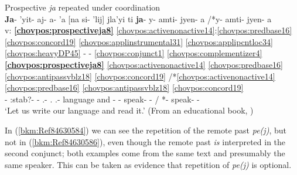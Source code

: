 \documentclass[output=paper]{langscibook}
\begin{document}
\ea\label{bkm:Ref84601460}Prospective \textit{ja} repeated under coordination \\ 
\glll {} \textbf{Ja}{}- 'yit- aj- a- 'a [na si- 'lij] jla'yi ti \textbf{ja}{}- y- amti- jyen- a /*y- amti- jyen- a \\ 
v: \textbf{\ref{chovpos:prospectiveja8}} \ref{chovpos:activenonactive14}:\ref{chovpos:predbase16} \ref{chovpos:concord19} \ref{chovpos:applinstrumental31} \ref{chovpos:applipcntloc34} \ref{chovpos:heavyDP45} - - \ref{chovpos:conjunct1} \ref{chovpos:complementizer4} \textbf{\ref{chovpos:prospectiveja8}} \ref{chovpos:activenonactive14} \ref{chovpos:predbase16} \ref{chovpos:antipassvblz18} \ref{chovpos:concord19} /*\ref{chovpos:activenonactive14} \ref{chovpos:predbase16} \ref{chovpos:antipassvblz18} \ref{chovpos:concord19} \\ 
{} \textbf{\Prosp{}}- \First:stab?- \First\Pl{}- \Ap.\Ins{}- \Ap.\Punct{} \Dem{} \First\Pl.\Poss{}- language and \Comp{} \textbf{\Prosp{}}- \First{}- speak- \Caus{}- \First\Pl{}/ *\First{}- speak- \Caus{}-  \First\Pl{} \\ 
\glt `Let us write our language and read it.' (From an educational book, \citealt{Drayson1999})
\z 

In (\ref{bkm:Ref84630584}) we can see the repetition of the remote past \textit{pe(j)}, but not in (\ref{bkm:Ref84630586}), even though the remote past \textit{is} interpreted in the second conjunct; both examples come from the same text and presumably the same speaker. This can be taken as evidence that repetition of \textit{pe(j)} is optional. 
\end{document}
